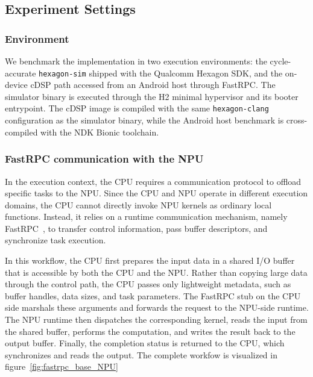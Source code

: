

\subsection{Experiment Settings}

\subsubsection{Environment}
We benchmark the implementation in two execution environments: the
cycle-accurate \texttt{hexagon-sim} shipped with the Qualcomm Hexagon SDK, and
the on-device cDSP path accessed from an Android host through FastRPC. The
simulator binary is executed through the H2 minimal hypervisor and its booter
entrypoint. The cDSP image is compiled with the same \texttt{hexagon-clang}
configuration as the simulator binary, while the Android host benchmark is
cross-compiled with the NDK Bionic toolchain.


\subsubsection{ FastRPC communication with the NPU}
In the execution context, the CPU requires a communication protocol to offload specific tasks to the NPU. Since the CPU and NPU operate in different execution domains, the CPU cannot directly invoke NPU kernels as ordinary local functions. Instead, it relies on a runtime communication mechanism, namely FastRPC~\cite{Qua18HexagonDSP}, to transfer control information, pass buffer descriptors, and synchronize task execution.

In this workflow, the CPU first prepares the input data in a shared I/O buffer that is accessible by both the CPU and the NPU. Rather than copying large data through the control path, the CPU passes only lightweight metadata, such as buffer handles, data sizes, and task parameters. The FastRPC stub on the CPU side marshals these arguments and forwards the request to the NPU-side runtime. The NPU runtime then dispatches the corresponding kernel, reads the input from the shared buffer, performs the computation, and writes the result back to the output buffer. Finally, the completion status is returned to the CPU, which synchronizes and reads the output. The complete workfow is visualized in figure~\ref{fig:fastrpc_base_NPU}

